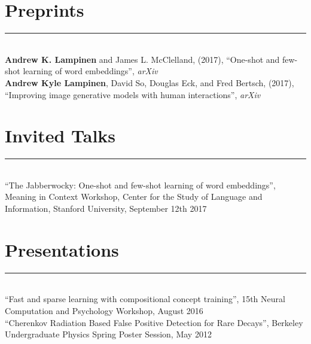 \documentclass[margin]{res}
\begin{document}
\begin{resume}
\vspace{1pt}\section{Preprints} \vspace{-15pt} \rule{\textwidth}{0.5pt} \\[3pt]
\textbf{Andrew K. Lampinen} and James L. McClelland, (2017), {``One-shot and few-shot learning of word embeddings''}, \textit{arXiv} \\ [3pt] 
\textbf{Andrew Kyle Lampinen}, David So, Douglas Eck, and Fred Bertsch, (2017), {``Improving image generative models with human interactions''}, \textit{arXiv} 
\vspace{1pt}\section{Invited Talks} \vspace{-15pt} \rule{\textwidth}{0.5pt} \\[3pt]
{``The Jabberwocky: One-shot and few-shot learning of word embeddings''}, Meaning in Context Workshop, Center for the Study of Language and Information,  Stanford University, September 12th 2017 
 
\vspace{1pt}\section{Presentations} \vspace{-15pt} \rule{\textwidth}{0.5pt} \\[3pt]
{``Fast and sparse learning with compositional concept training''}, 15th Neural Computation and Psychology Workshop, August 2016\\[3pt]
{``Cherenkov Radiation Based False Positive Detection for Rare Decays''}, Berkeley Undergraduate Physics Spring Poster Session, May 2012


\end{resume}
\end{document}
